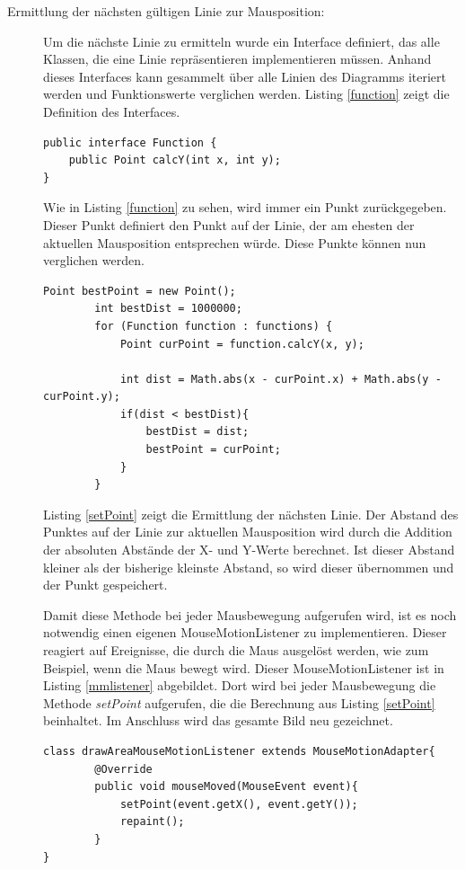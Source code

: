 \begin{description}
\item[Ermittlung der nächsten gültigen Linie zur Mausposition:] Um die nächste Linie zu ermitteln wurde ein Interface definiert, das alle Klassen, die eine Linie repräsentieren implementieren müssen. Anhand dieses Interfaces kann gesammelt über alle Linien des Diagramms iteriert werden und Funktionswerte verglichen werden. Listing \ref{function} zeigt die Definition des Interfaces.
\begin{lstlisting}[captionpos=b, caption=Interface für die Linien, label=function]
public interface Function {
    public Point calcY(int x, int y);
}
\end{lstlisting}

Wie in Listing \ref{function} zu sehen, wird immer ein Punkt zurückgegeben. Dieser Punkt definiert den Punkt auf der Linie, der am ehesten der aktuellen Mausposition entsprechen würde. Diese Punkte können nun verglichen werden.
\begin{lstlisting}[captionpos=b, caption=Methode zum ermitteln des nächsten Punktes, label=setPoint]
Point bestPoint = new Point();
        int bestDist = 1000000;
        for (Function function : functions) {
            Point curPoint = function.calcY(x, y);

            int dist = Math.abs(x - curPoint.x) + Math.abs(y -curPoint.y);
            if(dist < bestDist){
                bestDist = dist;
                bestPoint = curPoint;
            }
        }
\end{lstlisting}

Listing \ref{setPoint} zeigt die Ermittlung der nächsten Linie. Der Abstand des Punktes auf der Linie zur aktuellen Mausposition wird durch die Addition der absoluten Abstände der X- und Y-Werte berechnet. Ist dieser Abstand kleiner als der bisherige kleinste Abstand, so wird dieser übernommen und der Punkt gespeichert. 

Damit diese Methode bei jeder Mausbewegung aufgerufen wird, ist es noch notwendig einen eigenen MouseMotionListener zu implementieren. Dieser reagiert auf Ereignisse, die durch die Maus ausgelöst werden, wie zum Beispiel, wenn die Maus bewegt wird. Dieser MouseMotionListener ist in Listing \ref{mmlistener} abgebildet. Dort wird bei jeder Mausbewegung die Methode \emph{setPoint} aufgerufen, die die Berechnung aus Listing \ref{setPoint} beinhaltet. Im Anschluss wird das gesamte Bild neu gezeichnet.
\begin{lstlisting}[captionpos=b, caption=MouseMotionListener, label=mmlistener]
class drawAreaMouseMotionListener extends MouseMotionAdapter{
        @Override
        public void mouseMoved(MouseEvent event){
            setPoint(event.getX(), event.getY());
            repaint();
        }
}
\end{lstlisting}


\end{description}
